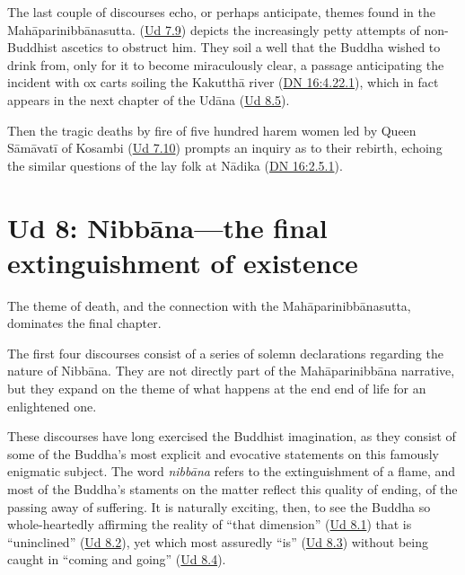 \documentclass[12pt,openany]{book}%
\begin{document}
The last couple of discourses echo, or perhaps anticipate, themes found in the \textsanskrit{Mahāparinibbānasutta}. (\href{https://suttacentral.net/ud7.9/en/sujato}{Ud 7.9}) depicts the increasingly petty attempts of non-Buddhist ascetics to obstruct him. They soil a well that the Buddha wished to drink from, only for it to become miraculously clear, a passage anticipating the incident with ox carts soiling the \textsanskrit{Kakutthā} river (\href{https://suttacentral.net/dn16/en/sujato\#4.22.1}{DN 16:4.22.1}), which in fact appears in the next chapter of the \textsanskrit{Udāna} (\href{https://suttacentral.net/ud8.5/en/sujato}{Ud 8.5}). 

Then the tragic deaths by fire of five hundred harem women led by Queen \textsanskrit{Sāmāvatī} of Kosambi (\href{https://suttacentral.net/ud7.10/en/sujato}{Ud 7.10}) prompts an inquiry as to their rebirth, echoing the similar questions of the lay folk at \textsanskrit{Nādika} (\href{https://suttacentral.net/dn16/en/sujato\#2.5.1}{DN 16:2.5.1}). 

\section*{Ud 8: \textsanskrit{Nibbāna}—the final extinguishment of existence}

The theme of death, and the connection with the \textsanskrit{Mahāparinibbānasutta}, dominates the final chapter. 

The first four discourses consist of a series of solemn declarations regarding the nature of \textsanskrit{Nibbāna}. They are not directly part of the \textsanskrit{Mahāparinibbāna} narrative, but they expand on the theme of what happens at the end end of life for an enlightened one. 

These discourses have long exercised the Buddhist imagination, as they consist of some of the Buddha’s most explicit and evocative statements on this famously enigmatic subject. The word \textit{\textsanskrit{nibbāna}} refers to the extinguishment of a flame, and most of the Buddha’s staments on the matter reflect this quality of ending, of the passing away of suffering. It is naturally exciting, then, to see the Buddha so whole-heartedly affirming the reality of “that dimension” (\href{https://suttacentral.net/ud8.1/en/sujato}{Ud 8.1}) that is “uninclined” (\href{https://suttacentral.net/ud8.2/en/sujato}{Ud 8.2}), yet which most assuredly “is” (\href{https://suttacentral.net/ud8.3/en/sujato}{Ud 8.3}) without being caught in “coming and going” (\href{https://suttacentral.net/ud8.4/en/sujato}{Ud 8.4}). 
\end{document}
